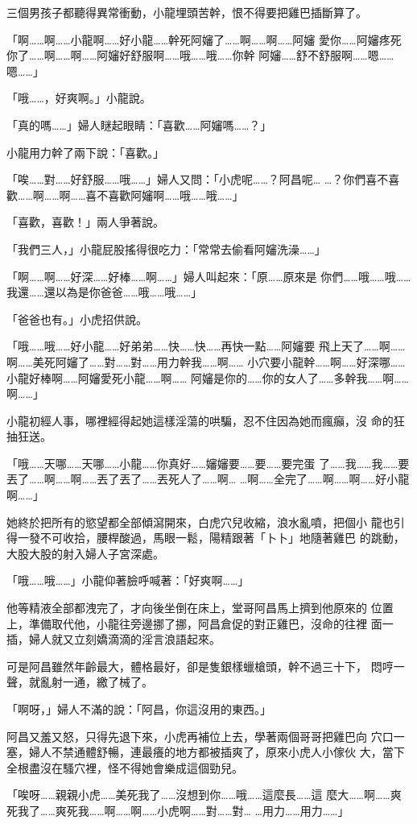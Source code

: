 三個男孩子都聽得異常衝動，小龍埋頭苦幹，恨不得要把雞巴插斷算了。

「啊……啊……小龍啊……好小龍……幹死阿嬸了……啊……啊……阿嬸
愛你……阿嬸疼死你了……啊……啊……阿嬸好舒服啊……哦……哦……你幹
阿嬸……舒不舒服啊……嗯……嗯……」

「哦……，好爽啊。」小龍說。

「真的嗎……」婦人瞇起眼睛：「喜歡……阿嬸嗎……？」

小龍用力幹了兩下說：「喜歡。」

「唉……對……好舒服……哦……」婦人又問：「小虎呢……？阿昌呢…
…？你們喜不喜歡……啊……啊……喜不喜歡阿嬸啊……哦……哦……」

「喜歡，喜歡！」兩人爭著說。

「我們三人，」小龍屁股搖得很吃力：「常常去偷看阿嬸洗澡……」

「啊……啊……好深……好棒……啊……」婦人叫起來：「原……原來是
你們……哦……哦……我還……還以為是你爸爸……哦……哦……」

「爸爸也有。」小虎招供說。

「哦……哦……好小龍……好弟弟……快……快……再快一點……阿嬸要
飛上天了……啊……啊……美死阿嬸了……對……對……用力幹我……啊……
小穴要小龍幹……啊……好深哪……小龍好棒啊……阿嬸愛死小龍……啊……
阿嬸是你的……你的女人了……多幹我……啊……啊……」

小龍初經人事，哪裡經得起她這樣淫蕩的哄騙，忍不住因為她而瘋癲，沒
命的狂抽狂送。

「哦……天哪……天哪……小龍……你真好……嬸嬸要……要……要完蛋
了……我……我……要丟了……啊……啊……丟了丟了……丟死人了……啊…
…啊……全完了……啊……啊……好小龍啊……」

她終於把所有的慾望都全部傾瀉開來，白虎穴兒收縮，浪水亂噴，把個小
龍也引得一發不可收拾，腰桿酸過，馬眼一鬆，陽精跟著「卜卜」地隨著雞巴
的跳動，大股大股的射入婦人子宮深處。

「哦……哦……」小龍仰著臉呼喊著：「好爽啊……」

他等精液全部都洩完了，才向後坐倒在床上，堂哥阿昌馬上擠到他原來的
位置上，準備取代他，小龍往旁邊挪了挪，阿昌倉促的對正雞巴，沒命的往裡
面一插，婦人就又立刻嬌滴滴的淫言浪語起來。

可是阿昌雖然年齡最大，體格最好，卻是隻銀樣蠟槍頭，幹不過三十下，
悶哼一聲，就亂射一通，繳了械了。

「啊呀，」婦人不滿的說：「阿昌，你這沒用的東西。」

阿昌又羞又怒，只得先退下來，小虎再補位上去，學著兩個哥哥把雞巴向
穴口一塞，婦人不禁通體舒暢，連最癢的地方都被插爽了，原來小虎人小傢伙
大，當下全根盡沒在騷穴裡，怪不得她會樂成這個勁兒。

「唉呀……親親小虎……美死我了……沒想到你……哦……這麼長……這
麼大……啊……爽死我了……爽死我……啊……啊……小虎啊……對……對…
…用力……用力……」

